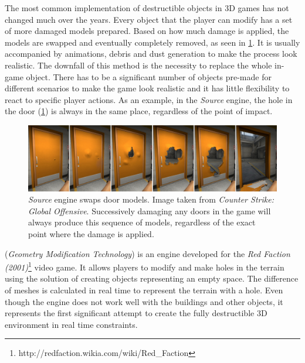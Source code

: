 The most common implementation of destructible objects in 3D games has not changed much over the years. Every object that the player can modify has a set of more damaged models prepared. Based on how much damage is applied, the models are swapped and eventually completely removed, as seen in \cref{fig:doors}. It is usually accompanied by animations, debris and dust generation to make the process look realistic. The downfall of this method is the necessity to replace the whole in-game object. There has to be a significant number of objects pre-made for different scenarios to make the game look realistic and it has little flexibility to react to specific player actions. As an example, in the \emph{Source} engine, the hole in the door (\cref{fig:doors}) is always in the same place, regardless of the point of impact.


\begin{figure} 
\centering
\includegraphics[width=\textwidth]{img/doors}
\caption{\emph{Source} engine swaps door models. Image taken from \emph{Counter Strike: Global Offensive}. Successively damaging any doors in the game will always produce this sequence of models, regardless of the exact point where the damage is applied.}
\label{fig:doors}
\end{figure}

 (\emph{Geometry Modification Technology}\cite{geomod}) is an engine developed for the \emph{Red Faction (2001)}\footnote{http://redfaction.wikia.com/wiki/Red\_Faction} video game. It allows players to modify and make holes in the terrain using the solution of creating objects representing an empty space. The difference of meshes is calculated in real time to represent the terrain with a hole. Even though the engine does not work well with the buildings and other objects, it represents the first significant attempt to create the fully destructible 3D environment in real time constraints.

